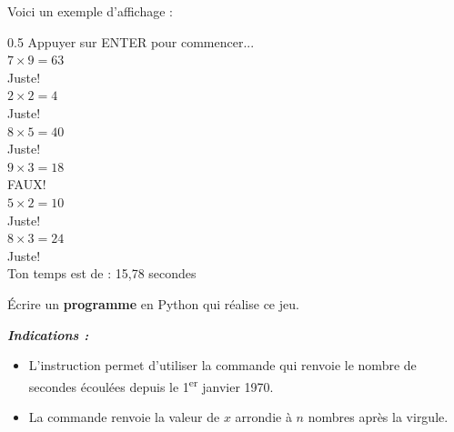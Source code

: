 \begin{boxexstheorieligne}
\smallskip
Voici un exemple d'affichage :

\begin{center}
\begin{affichage}{0.5}
Appuyer sur ENTER pour commencer...\\
$7\times 9 = 63$\\
Juste!\\
$2\times 2 = 4$\\
Juste!\\
$8\times 5 = 40$\\
Juste!\\
$9\times 3 = 18$\\
FAUX!\\
$5\times 2 = 10$\\
Juste!\\
$8\times 3 = 24$\\
Juste!\\
Ton temps est de : 15,78 secondes
\end{affichage}
\end{center}

\vspace{2mm} 
Écrire un {\bf programme} en Python qui réalise ce jeu.

\vspace{3mm}
\textit{\footnotesize\textbf{Indications :}}
\begin{minipage}[t]{0.9\textwidth}\footnotesize\itshape \begin{itemize}[leftmargin=*,itemsep=0mm,labelsep=1mm]

\item L\hspace{0.5pt}'\hspace{1pt}instruction  permet d'utiliser la commande  qui renvoie le nombre de secondes écoulées depuis le 1\textsuperscript{er} janvier 1970.

\item La commande  renvoie la valeur de $x$ arrondie à $n$ nombres après la virgule.

\end{itemize}
\end{minipage}


\end{boxexstheorieligne}















